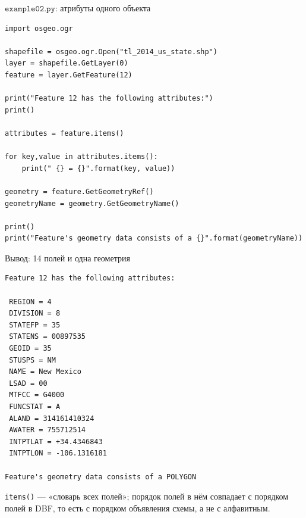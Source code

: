 \documentclass[aspectratio=169,10pt]{beamer}
\begin{document}
\begin{frame}[fragile]{$\texttt{example02.py}$: атрибуты одного объекта}
\begin{Verbatim}
import osgeo.ogr

shapefile = osgeo.ogr.Open("tl_2014_us_state.shp")
layer = shapefile.GetLayer(0)
feature = layer.GetFeature(12)

print("Feature 12 has the following attributes:")
print()

attributes = feature.items()

for key,value in attributes.items():
    print(" {} = {}".format(key, value))

geometry = feature.GetGeometryRef()
geometryName = geometry.GetGeometryName()

print()
print("Feature's geometry data consists of a {}".format(geometryName))
\end{Verbatim}
\end{frame}

\begin{frame}[fragile]{Вывод: 14 полей и одна геометрия}
\begin{Verbatim}[numbers=none,fontsize=\scriptsize]
Feature 12 has the following attributes:

 REGION = 4
 DIVISION = 8
 STATEFP = 35
 STATENS = 00897535
 GEOID = 35
 STUSPS = NM
 NAME = New Mexico
 LSAD = 00
 MTFCC = G4000
 FUNCSTAT = A
 ALAND = 314161410324
 AWATER = 755712514
 INTPTLAT = +34.4346843
 INTPTLON = -106.1316181

Feature's geometry data consists of a POLYGON
\end{Verbatim}
\vspace{0.2em}
{\footnotesize \texttt{items()} --- «словарь всех полей»; порядок полей
в нём совпадает с порядком полей в DBF, то есть с порядком объявления
схемы, а не с алфавитным.}
\end{frame}
\end{document}
